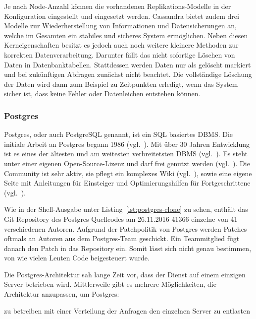 Je nach Node-Anzahl können die vorhandenen Replikations-Modelle in der
Konfiguration eingestellt und eingesetzt werden. Cassandra bietet zudem drei
Modelle zur Wiederherstellung von Informationen und Datensicherungen an, welche
im Gesamten ein stabiles und sicheres System ermöglichen. Neben diesen
Kerneigenschaften besitzt es jedoch auch noch weitere kleinere Methoden
zur korrekten Datenverarbeitung. Darunter fällt das nicht sofortige Löschen von
Daten in Datenbanktabellen. Stattdessen werden Daten nur als gelöscht markiert
und bei zukünftigen Abfragen zunächst nicht beachtet. Die vollständige Löschung
der Daten wird dann zum Beispiel zu Zeitpunkten erledigt, wenn das System
sicher ist, dass keine Fehler oder Datenleichen entstehen können.
\nl%

\subsubsection{Postgres}
\label{subsubsec:postgres}
Postgres, oder auch PostgreSQL genannt, ist ein \gls{SQL} basiertes \gls{DBMS}.
Die initiale Arbeit an Postgres begann 1986 (vgl.~\cite{old_postgres}). Mit
über 30 Jahren Entwicklung ist es eines der ältesten und am weitesten
verbreitetsten DBMS (vgl.~\cite{db_ranking}). Es steht unter einer eigenen
Open-Source-Lizenz und darf frei genutzt werden (vgl.~\cite{postgres_license}).
Die Community ist sehr aktiv, sie pflegt ein komplexes Wiki
(vgl.~\cite{postgres_wiki}), sowie eine eigene Seite mit Anleitungen für
Einsteiger und Optimierungshilfen für Fortgeschrittene
(vgl.~\cite{postgres_tutorial}).

Wie in der Shell-Ausgabe unter Listing~\ref{lst:postgres-clone} zu sehen,
enthält das \gls{Git}-\gls{Repository} des Postgres Quellcodes am 26.11.2016
41366 einzelne  von 41 verschiedenen Autoren. Aufgrund
der Patchpolitik von Postgres werden Patches oftmals an Autoren aus dem
Postgres-Team geschickt. Ein Teammitglied fügt danach den Patch in das
Repository ein. Somit lässt sich nicht genau bestimmen, von wie vielen Leuten
Code beigesteuert wurde.

Die Postgres-Architektur sah lange Zeit vor, dass der Dienst auf einem einzigen
Server betrieben wird. Mittlerweile gibt es mehrere Möglichkeiten, die
Architektur anzupassen, um Postgres:

\begin{outline}
  \1  zu betreiben
  \1 
  \1 mit einer Verteilung der Anfragen den einzelnen Server zu entlasten
\end{outline}

